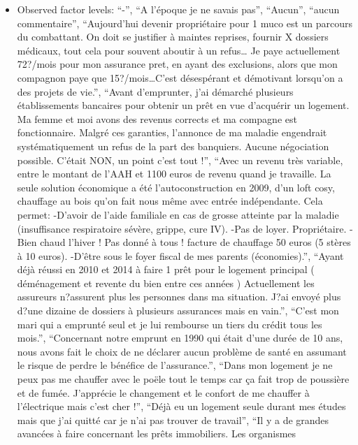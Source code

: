 \documentclass[
  letterpaper,
  DIV=11,
  numbers=noendperiod]{scrartcl}
\providecommand{\tightlist}{%
  \setlength{\itemsep}{0pt}\setlength{\parskip}{0pt}}
\begin{document}
\emini

\begin{itemize}
\tightlist
\item
  Observed factor levels: ``-'', ``A l'époque je ne savais pas'',
  ``Aucun'', ``aucun commentaire'', ``Aujourd'hui devenir propriétaire
  pour 1 muco est un parcours du combattant. On doit se justifier à
  maintes reprises, fournir X dossiers médicaux, tout cela pour souvent
  aboutir à un refus\ldots{} Je paye actuellement 72?/mois pour mon
  assurance pret, en ayant des exclusions, alors que mon compagnon paye
  que 15?/mois\ldots C'est désespérant et démotivant lorsqu'on a des
  projets de vie.'', ``Avant d'emprunter, j'ai démarché plusieurs
  établissements bancaires pour obtenir un prêt en vue d'acquérir un
  logement. Ma femme et moi avons des revenus corrects et ma compagne
  est fonctionnaire. Malgré ces garanties, l'annonce de ma maladie
  engendrait systématiquement un refus de la part des banquiers. Aucune
  négociation possible. C'était NON, un point c'est tout !'', ``Avec un
  revenu très variable, entre le montant de l'AAH et 1100 euros de
  revenu quand je travaille. La seule solution économique a été
  l'autoconstruction en 2009, d'un loft cosy, chauffage au bois qu'on
  fait nous même avec entrée indépendante. Cela permet: -D'avoir de
  l'aide familiale en cas de grosse atteinte par la maladie
  (insuffisance respiratoire sévère, grippe, cure IV). -Pas de loyer.
  Propriétaire. -Bien chaud l'hiver ! Pas donné à tous ! facture de
  chauffage 50 euros (5 stères à 10 euros). -D'être sous le foyer fiscal
  de mes parents (économies).'', ``Ayant déjà réussi en 2010 et 2014 à
  faire 1 prêt pour le logement principal ( déménagement et revente du
  bien entre ces années ) Actuellement les assureurs n?assurent plus les
  personnes dans ma situation. J?ai envoyé plus d?une dizaine de
  dossiers à plusieurs assurances mais en vain.'', ``C'est mon mari qui
  a emprunté seul et je lui rembourse un tiers du crédit tous les
  mois.'', ``Concernant notre emprunt en 1990 qui était d'une durée de
  10 ans, nous avons fait le choix de ne déclarer aucun problème de
  santé en assumant le risque de perdre le bénéfice de l'assurance.'',
  ``Dans mon logement je ne peux pas me chauffer avec le poële tout le
  temps car ça fait trop de poussière et de fumée. J'apprécie le
  changement et le confort de me chauffer à l'électrique mais c'est cher
  !'', ``Déjà eu un logement seule durant mes études mais que j'ai
  quitté car je n'ai pas trouver de travail'', ``Il y a de grandes
  avancées à faire concernant les prêts immobiliers. Les organismes

\end{itemize}
\end{document}
